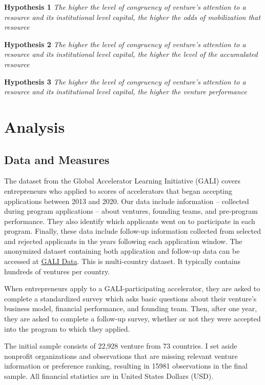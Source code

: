 \documentclass[
  english,
  man]{apa6}
\begin{document}
\textbf{Hypothesis 1} \emph{The higher the level of congruency of venture's attention to a resource and its institutional level capital, the higher the odds of mobilization that resource}

\textbf{Hypothesis 2} \emph{The higher the level of congruency of venture's attention to a resource and its institutional level capital, the higher the level of the accumulated resource}

\textbf{Hypothesis 3} \emph{The higher the level of congruency of venture's attention to a resource and its institutional level capital, the higher the venture performance}

\hypertarget{analysis}{%
\section{Analysis}\label{analysis}}

\hypertarget{data-and-measures}{%
\subsection{Data and Measures}\label{data-and-measures}}

The dataset from the Global Accelerator Learning Initiative (GALI) covers entrepreneurs who applied to scores of accelerators that began accepting applications between 2013 and 2020. Our data include information -- collected during program applications -- about ventures, founding teams, and pre-program performance. They also identify which applicants went on to participate in each program. Finally, these data include follow-up information collected from selected and rejected applicants in the years following each application window. The anonymized dataset containing both application and follow-up data can be accessed at \href{www.galidata.org/data-request}{GALI Data}. This is multi-country dataset. It typically contains hundreds of ventures per country.

When entrepreneurs apply to a GALI-participating accelerator, they are asked to complete a standardized survey which asks basic questions about their venture's business model, financial performance, and founding team. Then, after one year, they are asked to complete a follow-up survey, whether or not they were accepted into the program to which they applied.

The initial sample consists of 22,928 venture from 73 countries. I set aside nonprofit organizations and observations that are missing relevant venture information or preference ranking, resulting in 15981 observations in the final sample. All financial statistics are in United States Dollars (USD).
\end{document}
